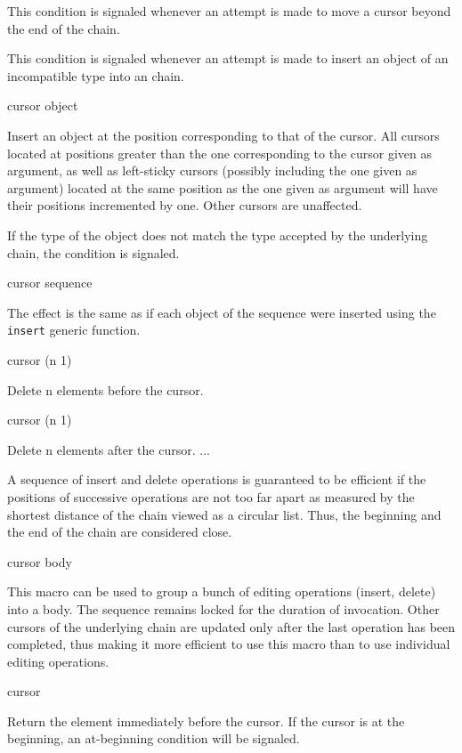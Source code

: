 \documentclass[11pt]{article}
\begin{document}

This condition is signaled whenever an attempt is made to move a
cursor beyond the end of the chain. 


This condition is signaled whenever an attempt is made to insert an
object of an incompatible type into an chain. 

 {cursor object}

Insert an object at the position corresponding to that of the cursor. 
All cursors located at positions greater than the one corresponding to
the cursor given as argument, as well as left-sticky cursors (possibly
including the one given as argument)  located at the same position as
the one given as argument will have their positions incremented by
one. Other cursors are unaffected. 

If the type of the object does not match the type accepted by the
underlying chain, the  condition is
signaled.

 {cursor sequence}

The effect is the same as if each object of the sequence were
inserted using the \texttt{insert} generic function. 

 {cursor \optional (n 1)}

Delete n elements before the cursor.

 {cursor \optional (n 1)}

Delete n elements after the cursor.  ...

A sequence of insert and delete operations is guaranteed to be
efficient if the positions of successive operations are not too far
apart as measured by the shortest distance of the chain viewed as a
circular list.  Thus, the beginning and the end of the chain are
considered close.

 {cursor \body body}

This macro can be used to group a bunch of editing operations (insert,
delete) into a body.  The sequence remains locked for the duration of
invocation.  Other cursors of the underlying chain are updated only
after the last operation has been completed, thus making it more
efficient to use this macro than to use individual editing operations.

 {cursor}

Return the element immediately before the cursor.  If the cursor is
at the beginning, an at-beginning condition will be signaled. 
\end{document}
